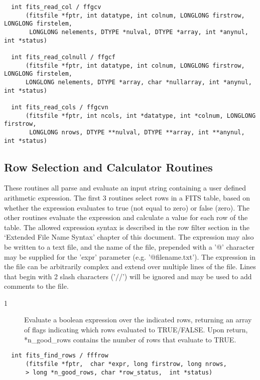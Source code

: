 \documentclass[11pt]{book}
\begin{document}
\begin{verbatim}
  int fits_read_col / ffgcv
      (fitsfile *fptr, int datatype, int colnum, LONGLONG firstrow, LONGLONG firstelem,
       LONGLONG nelements, DTYPE *nulval, DTYPE *array, int *anynul, int *status)

  int fits_read_colnull / ffgcf
      (fitsfile *fptr, int datatype, int colnum, LONGLONG firstrow, LONGLONG firstelem,
      LONGLONG nelements, DTYPE *array, char *nullarray, int *anynul, int *status)

  int fits_read_cols / ffgcvn
      (fitsfile *fptr, int ncols, int *datatype, int *colnum, LONGLONG firstrow, 
       LONGLONG nrows, DTYPE **nulval, DTYPE **array, int **anynul, int *status)
\end{verbatim}


\subsection{Row Selection and Calculator Routines}

These routines all parse and evaluate an input string containing a user
defined arithmetic expression.  The first 3 routines select rows in a
FITS table, based on whether the expression evaluates to true (not
equal to zero) or false (zero).  The other routines evaluate the
expression and calculate a value for each row of the table.  The
allowed expression syntax is described in the row filter section in the
`Extended File Name Syntax' chapter of this document.  The expression
may also be written to a text file, and the name of the file, prepended
with a '@' character may be supplied for the 'expr' parameter (e.g.
'@filename.txt'). The  expression  in  the  file can be arbitrarily
complex and extend over multiple lines of the file.  Lines  that begin
with 2 slash characters ('//') will  be ignored and may be used to add
comments to the file.


\begin{description}
\item[1 ] Evaluate a boolean expression over the indicated rows, returning an
 array of flags indicating which rows evaluated to TRUE/FALSE.
 Upon return,
 *n\_good\_rows contains the number of rows that evaluate to TRUE. \label{fffrow}
\end{description}

\begin{verbatim}
  int fits_find_rows / fffrow
      (fitsfile *fptr,  char *expr, long firstrow, long nrows,
      > long *n_good_rows, char *row_status,  int *status)
\end{verbatim}
\end{document}
